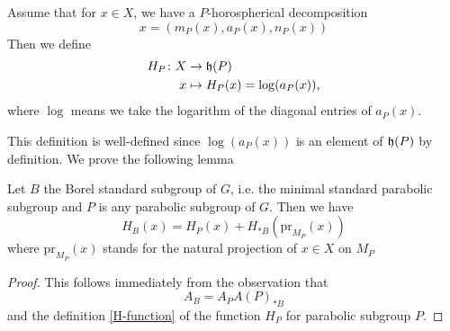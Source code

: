 \begin{definition}\label{H-function}
    Assume that for $x \in X$,
    we have a $P$-horospherical decomposition
    \[x = (m_P(x),a_P(x),n_P(x))\]
    Then we define
    \begin{align*}
        H_P \colon X & \to \operatorname{\mathfrak{h}}(P)                     \\
        x            & \mapsto H_P(x) = \log(a_P(x)),
    \end{align*}
    where $\log$ means we  take the logarithm of the diagonal entries of $a_P(x)$.
\end{definition}
This definition is well-defined since $\log(a_P(x))$ is an element of $\operatorname{\mathfrak{h}}(P)$ by definition.
We prove the following lemma
\begin{lemma}\label{H_P-decomp}
    Let $B$ the Borel standard subgroup of $G$, i.e. the minimal standard parabolic subgroup and $P$ is any parabolic subgroup of $G$.
    Then we have
    \[H_B(x) = H_P(x)+ H_{\ast B}(\text{pr}_{M_P}(x))\]
    where $\text{pr}_{M_P}(x)$ stands for the natural projection of $x \in X$ on $M_P$
\end{lemma}
\begin{proof}
This follows immediately from the observation that 
\[A_B = A_PA(P)_{\ast B}\]
and the definition \ref{H-function} of the function $H_P$ for parabolic subgroup $P$. 
\end{proof}


